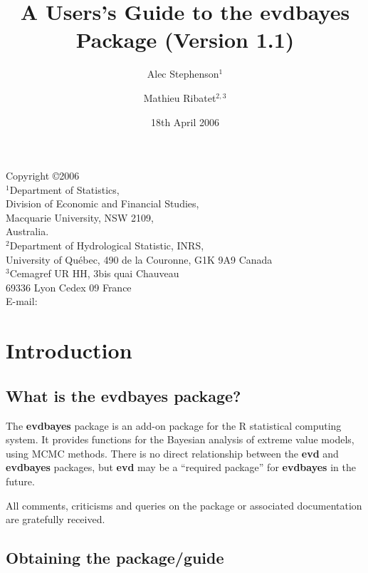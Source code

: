\documentclass[11pt,a4paper]{article}
\title{A Users's Guide to the evdbayes Package (Version 1.1)}
\author{Alec Stephenson$^1$ \and Mathieu Ribatet$^{2,3}$}
\date{18th April 2006}
\begin{document}
\maketitle
\begin{center}
  Copyright \copyright 2006 \\
  \vspace{0.2cm}
  $^1$Department of Statistics,\\
  Division of Economic and Financial Studies,\\
  Macquarie University, NSW 2109,\\
  Australia. \\
  \vspace{0.2cm}
  $^2$Department of Hydrological Statistic, INRS,\\
  University of Qu\'ebec, 490 de la Couronne, G1K 9A9 Canada\\
  \vspace{0.2cm} $^3$Cemagref UR HH, 3bis quai Chauveau\\ 69336 Lyon Cedex
  09 France\\ \vspace{0.2cm}
  E-mail:  \hspace{0.5cm}
  \\
\end{center}


\section{Introduction}
\setcounter{footnote}{0}

\subsection{What is the evdbayes package?}

The \textbf{evdbayes} package is an add-on package for the R \citep{R}
statistical computing system.  It provides functions for the Bayesian
analysis of extreme value models, using MCMC methods.  There is no
direct relationship between the \textbf{evd} \citep{step:rn} and
\textbf{evdbayes} packages, but \textbf{evd} may be a ``required
package'' for \textbf{evdbayes} in the future.

All comments, criticisms and queries on the package or associated
documentation are gratefully received.

\subsection{Obtaining the package/guide}
\end{document}
